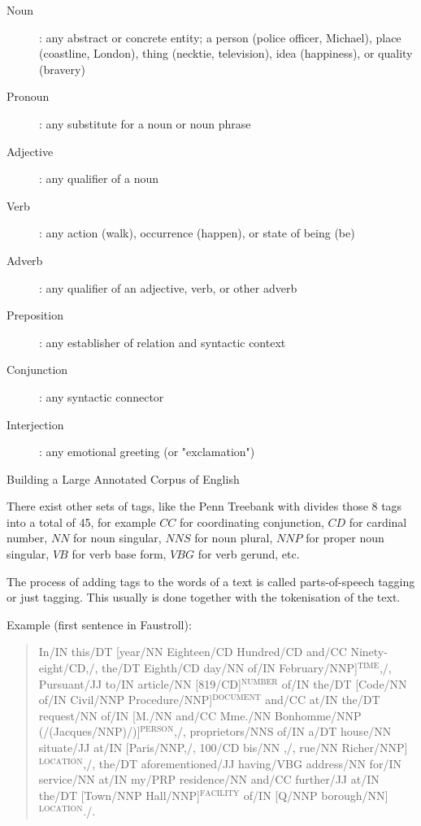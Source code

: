 \begin{description}
  \item [Noun]: any abstract or concrete entity; a person (police officer, Michael), place (coastline, London), thing (necktie, television), idea (happiness), or quality (bravery)
  \item [Pronoun]: any substitute for a noun or noun phrase
  \item [Adjective]: any qualifier of a noun
  \item [Verb]: any action (walk), occurrence (happen), or state of being (be)
  \item [Adverb]: any qualifier of an adjective, verb, or other adverb
  \item [Preposition]: any establisher of relation and syntactic context
  \item [Conjunction]: any syntactic connector
  \item [Interjection]: any emotional greeting (or "exclamation")
\end{description}

Building a Large Annotated Corpus of English \citep{Marcus1993}

There exist other sets of tags, like the Penn Treebank with divides those 8 tags into a total of 45, for example $CC$ for coordinating conjunction, $CD$ for cardinal number, $NN$ for noun singular, $NNS$ for noun plural, $NNP$ for proper noun singular, $VB$ for verb base form, $VBG$ for verb gerund, etc.

The process of adding tags to the words of a text is called parts-of-speech tagging or just tagging. This usually is done together with the tokenisation of the text.

Example (first sentence in Faustroll):

\begin{quote}
  In/IN this/DT [year/NN Eighteen/CD Hundred/CD and/CC Ninety-eight/CD,/, the/DT Eighth/CD day/NN of/IN February/NNP]$^{\text{TIME}}$,/, Pursuant/JJ to/IN article/NN [819/CD]$^{\text{NUMBER}}$ of/IN the/DT [Code/NN of/IN Civil/NNP Procedure/NNP]$^{\text{DOCUMENT}}$ and/CC at/IN the/DT request/NN of/IN [M./NN and/CC Mme./NN Bonhomme/NNP (/(Jacques/NNP)/)]$^{\text{PERSON}}$,/, proprietors/NNS of/IN a/DT house/NN situate/JJ at/IN [Paris/NNP,/, 100/CD bis/NN ,/, rue/NN Richer/NNP]$^{\text{LOCATION}}$,/, the/DT aforementioned/JJ having/VBG address/NN for/IN service/NN at/IN my/PRP residence/NN and/CC further/JJ at/IN the/DT [Town/NNP Hall/NNP]$^{\text{FACILITY}}$ of/IN [Q/NNP borough/NN]$^{\text{LOCATION}}$./.
\end{quote}

